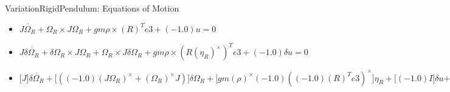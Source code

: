 VariationRigidPendulum: Equations of Motion
\begin{itemize}
\item $J \dot{\Omega_{R}}+\Omega_{R}\times J \Omega_{R}+g m \rho\times {(R)}^{T} e3+(-1.0) u=0$
\item $J \delta \dot{\Omega_{R}}+\delta \Omega_{R}\times J \Omega_{R}+\Omega_{R}\times J \delta \Omega_{R}+g m \rho\times {(R {(\eta_{R})}^\times)}^{T} e3+(-1.0) \delta u=0$
\item $\Big[J\Big]\delta \dot{\Omega_{R}}+\Big[((-1.0) {(J \Omega_{R})}^\times+{(\Omega_{R})}^\times J)\Big]\delta \Omega_{R}+\Big[g m {(\rho)}^\times (-1.0) {((-1.0) {(R)}^{T} e3)}^\times\Big]\eta_{R}+\Big[(-1.0) I\Big]\delta u+=0$
\end{itemize}